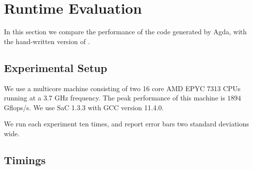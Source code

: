 \section{Runtime Evaluation}

In this section we compare the performance of the code generated by Agda,
with the hand-written version of \cite{}. 

\subsection{Experimental Setup}

We use a multicore machine consisting of two 16 core AMD EPYC 7313
CPUs running at a 3.7 GHz frequency. The peak performance of this 
machine is $1894$ Gflops/s.
We use SaC 1.3.3 with GCC version 11.4.0.

We run each experiment ten times, and report error bars two standard deviations
wide.

\subsection{Timings}

